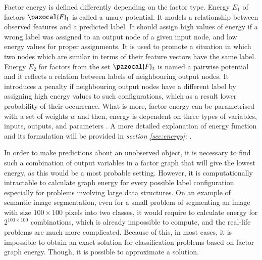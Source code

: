 Factor energy is defined differently depending on the factor type. Energy $E_1$ of factors $\pazocal{F}_1$ is called a unary potential. It models a relationship between observed features and a predicted label. It should assign high values of energy if a wrong label was assigned to an output node of a given input node, and low energy values for proper assignments. It is used to promote a situation in which two nodes which are similar in terms of their feature vectors have the same label. Energy $E_2$ for factors from the set $\pazocal{F}_2$ is named a pairwise potential and it reflects a relation between labels of neighbouring output nodes. It introduces a penalty if neighbouring output nodes have a different label by assigning high energy values to such configurations, which as a result lower probability of their occurrence. What is more, factor energy can be parametrised with a set of weights $w$ and then, energy is dependent on three types of variables, inputs, outputs, and parameters \cite{inference_crf}. A more detailed explanation of energy function and its formulation will be provided in \textit{section \ref{sec:energy}: }.

In order to make predictions about an unobserved object, it is necessary to find such a combination of output variables in a factor graph that will give the lowest energy, as this would be a most probable setting. However, it is computationally intractable to calculate graph energy for every possible label configuration especially for problems involving large data structures. On an example of semantic image segmentation, even for a small problem of segmenting an image with size $100\times100$ pixels into two classes, it would require to calculate energy for $2^{100\times100}$ combinations, which is already impossible to compute, and the real-life problems are much more complicated. Because of this, in most cases, it is impossible to obtain an exact solution for classification problems based on factor graph energy. Though, it is possible to approximate a solution.